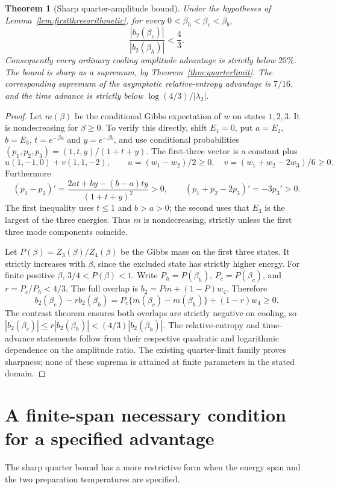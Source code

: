 \documentclass[11pt]{article}
\newtheorem{theorem}{Theorem}
\begin{document}
\begin{theorem}[Sharp quarter-amplitude bound]\label{thm:fulltripletbound}
Under the hypotheses of Lemma~\ref{lem:firstthreearithmetic}, for every
$0<\beta_h<\beta_c<\beta_b$,
\[
\frac{|b_2(\beta_c)|}{|b_2(\beta_h)|}<\frac43.
\]
Consequently every ordinary cooling amplitude advantage is strictly below
$25\%$. The bound is sharp as a supremum, by
Theorem~\ref{thm:quarterlimit}. The corresponding supremum of the
asymptotic relative-entropy advantage is $7/16$, and the time advance is
strictly below $\log(4/3)/|\lambda_2|$.
\end{theorem}
\begin{proof}
Let $m(\beta)$ be the conditional Gibbs expectation of $w$ on states
$1,2,3$. It is nondecreasing for $\beta\geq0$. To verify this directly,
shift $E_1=0$, put $a=E_2$, $b=E_3$, $t=e^{-\beta a}$ and
$y=e^{-\beta b}$, and use conditional probabilities
$(p_1,p_2,p_3)=(1,t,y)/(1+t+y)$. The first-three vector is a constant
plus
\[
u(1,-1,0)+v(1,1,-2),\qquad
u=(w_1-w_2)/2\geq0,\quad v=(w_1+w_2-2w_3)/6\geq0.
\]
Furthermore
\[
(p_1-p_2)'=\frac{2at+by-(b-a)ty}{(1+t+y)^2}>0,
\qquad (p_1+p_2-2p_3)'=-3p_3'>0.
\]
The first inequality uses $t\leq1$ and $b>a>0$; the second uses that
$E_3$ is the largest of the three energies. Thus $m$ is nondecreasing,
strictly unless the first three mode components coincide.

Let $P(\beta)=Z_3(\beta)/Z_4(\beta)$ be the Gibbs mass on the first three
states. It strictly increases with $\beta$, since the excluded state has
strictly higher energy. For finite positive $\beta$, $3/4<P(\beta)<1$.
Write $P_h=P(\beta_h)$, $P_c=P(\beta_c)$, and $r=P_c/P_h<4/3$.
The full overlap is $b_2=Pm+(1-P)w_4$. Therefore
\[
b_2(\beta_c)-r b_2(\beta_h)
=P_c\{m(\beta_c)-m(\beta_h)\}+(1-r)w_4\geq0.
\]
The contrast theorem ensures both overlaps are strictly negative on cooling,
so $|b_2(\beta_c)|\leq r|b_2(\beta_h)|<(4/3)|b_2(\beta_h)|$.
The relative-entropy and time-advance statements follow from their respective
quadratic and logarithmic dependence on the amplitude ratio. The existing
quarter-limit family proves sharpness; none of these suprema is attained at
finite parameters in the stated domain.
\end{proof}

\section{A finite-span necessary condition for a specified advantage}
\label{sec:finitespanamplitude}
The sharp quarter bound has a more restrictive form when the energy span
and the two preparation temperatures are specified.
\end{document}
